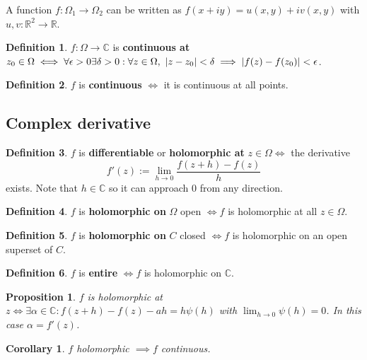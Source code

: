 \documentclass[12pt]{article}
\newtheorem{cor}[thm]{Corollary}
\newtheorem{prop}[thm]{Proposition}
\theoremstyle{definition}
\newtheorem{defn}{Definition}[section]
\newcommand{\C}{\mathbb{C}}
\newcommand{\R}{\mathbb{R}}
\DeclarePairedDelimiter\abs{\lvert}{\rvert}
\begin{document}
A function $f : \Omega_1 \to \Omega_2$ can be written as $f(x + iy) = u(x, y) + iv(x, y)$ with $u, v : \R^2 \to \R$.

\begin{defn}
  $f : \Omega \to \C$ is \textbf{continuous at} $z_0 \in \Omega \iff \forall \epsilon > 0 \exists \delta > 0 : \forall z \in \Omega,\ \abs{z - z_0} < \delta \implies \abs{f(z) - f(z_0)} < \epsilon$.
\end{defn}

\begin{defn}
  $f$ is \textbf{continuous} $\iff$ it is continuous at all points.
\end{defn}


\subsection{Complex derivative}

\begin{defn}
  $f$ is \textbf{differentiable} or \textbf{holomorphic at} $z \in \Omega \iff$ the derivative
  $$f'(z) := \lim_{h \to 0}\frac{f(z + h) - f(z)}{h}$$
  exists.
  Note that $h \in \C$ so it can approach 0 from any direction.
\end{defn}

\begin{defn}
  $f$ is \textbf{holomorphic on} $\Omega$ open $\iff f$ is holomorphic at all $z \in \Omega$.
\end{defn}

\begin{defn}
  $f$ is \textbf{holomorphic on} $C$ closed $\iff f$ is holomorphic on an open superset of $C$.
\end{defn}

\begin{defn}
  $f$ is \textbf{entire} $\iff f$ is holomorphic on $\C$.
\end{defn}

\begin{prop}
  $f$ is holomorphic at $z \iff \exists \alpha \in \C : f(z + h) - f(z) - ah = h\psi(h)$ with $\lim_{h \to 0}\psi(h) = 0$.
  In this case $\alpha = f'(z)$.
\end{prop}

\begin{cor}
  $f$ holomorphic $\implies f$ continuous.
\end{cor}
\end{document}
